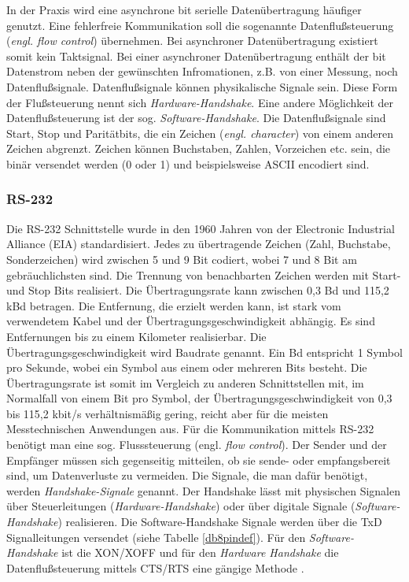 In der Praxis wird eine asynchrone bit serielle Datenübertragung häufiger genutzt. Eine fehlerfreie Kommunikation soll die sogenannte Datenflußsteuerung (\textit{engl. flow control}) übernehmen. Bei asynchroner Datenübertragung existiert somit kein Taktsignal. Bei einer asynchroner Datenübertragung enthält der bit Datenstrom neben der \glqq gewünschten\grqq{} Infromationen, z.B. von einer Messung, noch Datenflußsignale. Datenflußsignale können physikalische Signale sein. Diese Form der Flußsteuerung nennt sich \textit{Hardware-Handshake}.
Eine andere Möglichkeit der Datenflußsteuerung ist der sog. \textit{Software-Handshake}. Die Datenflußsignale sind Start, Stop und Paritätbits, die ein Zeichen (\textit{engl. character}) von einem anderen Zeichen abgrenzt. Zeichen können Buchstaben, Zahlen, Vorzeichen etc. sein, die binär versendet werden (0 oder 1) und beispielsweise ASCII encodiert sind.



\subsubsection{RS-232}

Die RS-232 Schnittstelle wurde in den 1960 Jahren von der Electronic Industrial Alliance (EIA) standardisiert. Jedes zu übertragende Zeichen (Zahl, Buchstabe, Sonderzeichen) wird zwischen 5 und 9 Bit codiert, wobei 7 und 8 Bit am gebräuchlichsten sind. Die Trennung von benachbarten Zeichen werden mit Start- und Stop Bits realisiert. Die Übertragungsrate kann zwischen 0,3 Bd und 115,2 kBd betragen. Die Entfernung, die erzielt werden kann, ist stark vom verwendetem Kabel und der Übertragungsgeschwindigkeit abhängig. Es sind Entfernungen bis zu einem Kilometer realisierbar. Die Übertragungsgeschwindigkeit wird Baudrate genannt. Ein Bd entspricht 1 Symbol pro Sekunde, wobei ein Symbol aus einem oder mehreren Bits besteht. Die Übertragungsrate ist somit im Vergleich zu anderen Schnittstellen mit, im Normalfall von einem Bit pro Symbol, der Übertragungsgeschwindigkeit von 0,3 bis 115,2 kbit/s verhältnismäßig gering, reicht aber für die meisten Messtechnischen Anwendungen aus. Für die Kommunikation mittels RS-232 benötigt man eine sog. Flusssteuerung (engl. \textit{flow control}). Der Sender und der Empfänger müssen sich gegenseitig mitteilen, ob sie sende- oder empfangsbereit sind, um Datenverluste zu vermeiden. Die Signale, die man dafür benötigt, werden \textit{Handshake-Signale} genannt. Der Handshake lässt mit physischen Signalen über Steuerleitungen (\textit{Hardware-Handshake}) oder über digitale Signale (\textit{Software-Handshake}) realisieren. Die Software-Handshake Signale werden über die TxD Signalleitungen versendet (siehe Tabelle \ref{db8pindef}). Für den \textit{Software-Handshake} ist die XON/XOFF und für den \textit{Hardware Handshake} die Datenflußsteuerung mittels CTS/RTS eine gängige Methode \cite[S. 480 f.]{Busch2015}. \\

